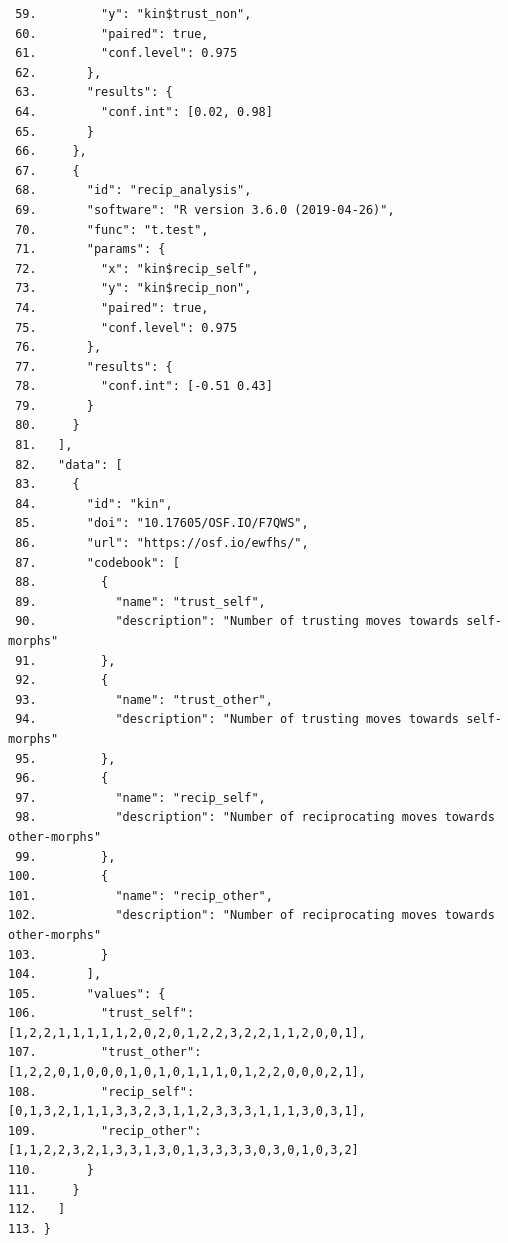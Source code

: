 \documentclass[doc,floatsintext]{apa6}
\begin{document}
\begin{verbatim}
 59.         "y": "kin$trust_non",
 60.         "paired": true,
 61.         "conf.level": 0.975
 62.       },
 63.       "results": {
 64.         "conf.int": [0.02, 0.98]
 65.       }
 66.     },
 67.     {
 68.       "id": "recip_analysis",
 69.       "software": "R version 3.6.0 (2019-04-26)",
 70.       "func": "t.test",
 71.       "params": {
 72.         "x": "kin$recip_self",
 73.         "y": "kin$recip_non",
 74.         "paired": true,
 75.         "conf.level": 0.975
 76.       },
 77.       "results": {
 78.         "conf.int": [-0.51 0.43]
 79.       }
 80.     }
 81.   ],
 82.   "data": [
 83.     {
 84.       "id": "kin",
 85.       "doi": "10.17605/OSF.IO/F7QWS",
 86.       "url": "https://osf.io/ewfhs/",
 87.       "codebook": [
 88.         {
 89.           "name": "trust_self",
 90.           "description": "Number of trusting moves towards self-morphs"
 91.         },
 92.         {
 93.           "name": "trust_other",
 94.           "description": "Number of trusting moves towards self-morphs"
 95.         },
 96.         {
 97.           "name": "recip_self",
 98.           "description": "Number of reciprocating moves towards other-morphs"
 99.         },
100.         {
101.           "name": "recip_other",
102.           "description": "Number of reciprocating moves towards other-morphs"
103.         }
104.       ],
105.       "values": {
106.         "trust_self": [1,2,2,1,1,1,1,1,2,0,2,0,1,2,2,3,2,2,1,1,2,0,0,1],
107.         "trust_other": [1,2,2,0,1,0,0,0,1,0,1,0,1,1,1,0,1,2,2,0,0,0,2,1],
108.         "recip_self": [0,1,3,2,1,1,1,3,3,2,3,1,1,2,3,3,3,1,1,1,3,0,3,1],
109.         "recip_other": [1,1,2,2,3,2,1,3,3,1,3,0,1,3,3,3,3,0,3,0,1,0,3,2]
110.       }
111.     }
112.   ]
113. }
\end{verbatim}
\end{document}
